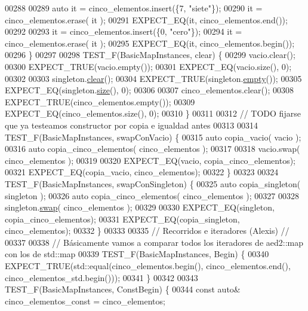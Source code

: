 \begin{DoxyCode}
00288 
00289     \textcolor{keyword}{auto} it = cinco\_elementos.insert(\{7, \textcolor{stringliteral}{"siete"}\});
00290     it = cinco\_elementos.erase( it );
00291     EXPECT\_EQ(it, cinco\_elementos.end());
00292 
00293     it = cinco\_elementos.insert(\{0, \textcolor{stringliteral}{"cero"}\});
00294     it = cinco\_elementos.erase( it );
00295     EXPECT\_EQ(it, cinco\_elementos.begin());
00296 \}
00297 
00298 TEST\_F(BasicMapInstances, clear) \{
00299     vacio.clear();
00300     EXPECT\_TRUE(vacio.empty());
00301     EXPECT\_EQ(vacio.size(), 0);
00302 
00303     singleton.\hyperlink{classaed2_1_1map_a2bfa5165825979bf2431db55bc6bc9ca_a2bfa5165825979bf2431db55bc6bc9ca}{clear}();
00304     EXPECT\_TRUE(singleton.\hyperlink{classaed2_1_1map_a0dcb39283f4877ae59cb756ed1d0c048_a0dcb39283f4877ae59cb756ed1d0c048}{empty}());
00305     EXPECT\_EQ(singleton.\hyperlink{classaed2_1_1map_aa6e806b3be6dc0da79adbfae08b571bf_aa6e806b3be6dc0da79adbfae08b571bf}{size}(), 0);
00306 
00307     cinco\_elementos.clear();
00308     EXPECT\_TRUE(cinco\_elementos.empty());
00309     EXPECT\_EQ(cinco\_elementos.size(), 0);
00310 \}
00311 
00312 \textcolor{comment}{// TODO fijarse que ya testeamos constructor por copia e igualdad antes}
00313 
00314 TEST\_F(BasicMapInstances, swapConVacio) \{
00315     \textcolor{keyword}{auto} copia\_vacio( vacio );
00316     \textcolor{keyword}{auto} copia\_cinco\_elementos( cinco\_elementos );
00317 
00318     vacio.swap( cinco\_elementos );
00319 
00320     EXPECT\_EQ(vacio, copia\_cinco\_elementos);
00321     EXPECT\_EQ(copia\_vacio, cinco\_elementos);
00322 \}
00323 
00324 TEST\_F(BasicMapInstances, swapConSingleton) \{
00325     \textcolor{keyword}{auto} copia\_singleton( singleton );
00326     \textcolor{keyword}{auto} copia\_cinco\_elementos( cinco\_elementos );
00327 
00328     singleton.\hyperlink{classaed2_1_1map_a43ddb71cc91e5c6021a7a1f243d6cc4a_a43ddb71cc91e5c6021a7a1f243d6cc4a}{swap}( cinco\_elementos );
00329 
00330     EXPECT\_EQ(singleton, copia\_cinco\_elementos);
00331     EXPECT\_EQ(copia\_singleton, cinco\_elementos);
00332 \}
00333 
00335 \textcolor{comment}{// Recorridos e iteradores (Alexis) //}
00337 \textcolor{comment}{}
00338 \textcolor{comment}{// Básicamente vamos a comparar todos los iteradores de aed2::map con los de std::map}
00339 TEST\_F(BasicMapInstances, Begin) \{
00340     EXPECT\_TRUE(std::equal(cinco\_elementos.begin(), cinco\_elementos.end(), cinco\_elementos\_std.begin()));
00341 \}
00342 
00343 TEST\_F(BasicMapInstances, ConstBegin) \{
00344     \textcolor{keyword}{const} \textcolor{keyword}{auto}& cinco\_elementos\_const = cinco\_elementos;

\end{DoxyCode}
